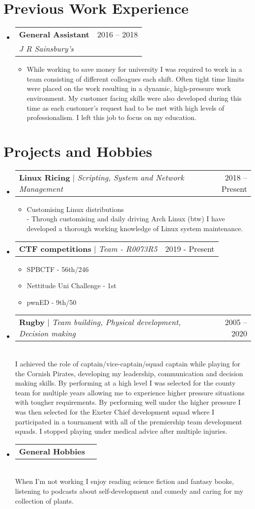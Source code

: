 \documentclass[letterpaper,11pt]{article}
\makeatletter
\newcommand{\resumeItem}[1]{
  \item\small{
    {#1 \vspace{-2pt}}
  }
}
\newcommand{\resumeSubheading}[4]{
  \vspace{-2pt}\item
    \begin{tabular*}{0.97\textwidth}[t]{l@{\extracolsep{\fill}}r}
      \textbf{#1} & #2 \\
      \textit{\small#3} & \textit{\small #4} \\
    \end{tabular*}\vspace{-7pt}
}
\newcommand{\resumeProjectHeading}[2]{
    \item
    \begin{tabular*}{0.97\textwidth}{l@{\extracolsep{\fill}}r}
      \small#1 & #2 \\
    \end{tabular*}\vspace{-7pt}
}
\newcommand{\resumeSubHeadingListStart}{\begin{itemize}[leftmargin=0.15in, label={}]}
\newcommand{\resumeSubHeadingListEnd}{\end{itemize}}
\newcommand{\resumeItemListStart}{\begin{itemize}}
\newcommand{\resumeItemListEnd}{\end{itemize}\vspace{-5pt}}
\makeatother
\begin{document}
\section{Previous Work Experience}
  \resumeSubHeadingListStart
    \resumeSubheading
      {General Assistant}{2016 – 2018}
      {J R Sainsbury's}{}
      \resumeItemListStart
        \resumeItem{While working to save money for university I was required to work in a team consisting of different colleagues each shift. Often tight time limits were placed on the work resulting in a dynamic, high-pressure work environment. My customer facing skills were also developed during this time as each customer's request had to be met with high levels of professionalism. I left this job to focus on my education.}
      \resumeItemListEnd
    \resumeSubHeadingListEnd

    \newpage
\section{Projects and Hobbies}

    \resumeSubHeadingListStart
      \resumeProjectHeading
          {\textbf{Linux Ricing} $|$ \emph{Scripting, System and Network Management}}{2018 -- Present}
          \resumeItemListStart
            \resumeItem{Customising Linux distributions}\\
            - Through customising and daily driving Arch Linux (btw) I have developed a thorough working knowledge of Linux system maintenance.
          \resumeItemListEnd
      \resumeProjectHeading
          {\textbf{CTF competitions} $|$ \emph{Team - R0073R5}}{2019 - Present}
          \resumeItemListStart
            \resumeItem{SPBCTF - 56th/246}
            \resumeItem{Nettitude Uni Challenge - 1st}
            \resumeItem{pwnED - 9th/50}
          \resumeItemListEnd
      \resumeProjectHeading
          {\textbf{Rugby} $|$ \emph{Team building, Physical development, Decision making}}{2005 -- 2020}\\
          \hfill \break
          I achieved the role of captain/vice-captain/squad captain while playing for the Cornish Pirates, developing my leadership, communication and decision making skills. By performing at a high level I was selected for the county team for multiple years allowing me to experience higher pressure situations with tougher requirements. By performing well under the higher pressure I was then selected for the Exeter Chief development squad where I participated in a tournament with all of the premiership team development squads. I stopped playing under medical advice after multiple injuries.
          \resumeProjectHeading
          {\textbf{General Hobbies}  \emph{}}{}\\
          \hfill \break
          When I'm not working I enjoy reading science fiction and fantasy books, listening to podcasts about self-development and comedy and caring for my collection of plants.
    \resumeSubHeadingListEnd
\end{document}
